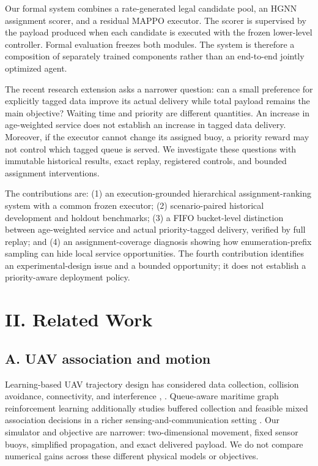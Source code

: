 Our formal system combines a rate-generated legal candidate pool, an HGNN assignment scorer, and a residual MAPPO executor. The scorer is supervised by the payload produced when each candidate is executed with the frozen lower-level controller. Formal evaluation freezes both modules. The system is therefore a composition of separately trained components rather than an end-to-end jointly optimized agent.

The recent research extension asks a narrower question: can a small preference for explicitly tagged data improve its actual delivery while total payload remains the main objective? Waiting time and priority are different quantities. An increase in age-weighted service does not establish an increase in tagged data delivery. Moreover, if the executor cannot change its assigned buoy, a priority reward may not control which tagged queue is served. We investigate these questions with immutable historical results, exact replay, registered controls, and bounded assignment interventions.

The contributions are: (1) an execution-grounded hierarchical assignment-ranking system with a common frozen executor; (2) scenario-paired historical development and holdout benchmarks; (3) a FIFO bucket-level distinction between age-weighted service and actual priority-tagged delivery, verified by full replay; and (4) an assignment-coverage diagnosis showing how enumeration-prefix sampling can hide local service opportunities. The fourth contribution identifies an experimental-design issue and a bounded opportunity; it does not establish a priority-aware deployment policy.

\section*{II. Related Work}

\subsection*{A. UAV association and motion}

Learning-based UAV trajectory design has considered data collection, collision avoidance, connectivity, and interference \cite{xu2022}, \cite{wang2022}. Queue-aware maritime graph reinforcement learning additionally studies buffered collection and feasible mixed association decisions in a richer sensing-and-communication setting \cite{li2026}. Our simulator and objective are narrower: two-dimensional movement, fixed sensor buoys, simplified propagation, and exact delivered payload. We do not compare numerical gains across these different physical models or objectives.

